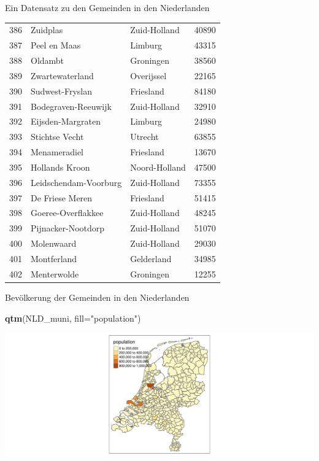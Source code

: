 \documentclass[ignorenonframetext,]{beamer}
\newenvironment{Shaded}{\begin{snugshade}}{\end{snugshade}}
\newcommand{\DataTypeTok}[1]{\textcolor[rgb]{0.13,0.29,0.53}{#1}}
\newcommand{\KeywordTok}[1]{\textcolor[rgb]{0.13,0.29,0.53}{\textbf{#1}}}
\newcommand{\NormalTok}[1]{#1}
\newcommand{\StringTok}[1]{\textcolor[rgb]{0.31,0.60,0.02}{#1}}
\begin{document}
\begin{frame}[fragile]{Ein Datensatz zu den Gemeinden in den
Niederlanden}
\begin{longtable}[]{@{}lllr@{}}
386 & Zuidplas & Zuid-Holland & 40890\tabularnewline
387 & Peel en Maas & Limburg & 43315\tabularnewline
388 & Oldambt & Groningen & 38560\tabularnewline
389 & Zwartewaterland & Overijssel & 22165\tabularnewline
390 & Sudwest-Fryslan & Friesland & 84180\tabularnewline
391 & Bodegraven-Reeuwijk & Zuid-Holland & 32910\tabularnewline
392 & Eijsden-Margraten & Limburg & 24980\tabularnewline
393 & Stichtse Vecht & Utrecht & 63855\tabularnewline
394 & Menameradiel & Friesland & 13670\tabularnewline
395 & Hollands Kroon & Noord-Holland & 47500\tabularnewline
396 & Leidschendam-Voorburg & Zuid-Holland & 73355\tabularnewline
397 & De Friese Meren & Friesland & 51415\tabularnewline
398 & Goeree-Overflakkee & Zuid-Holland & 48245\tabularnewline
399 & Pijnacker-Nootdorp & Zuid-Holland & 51070\tabularnewline
400 & Molenwaard & Zuid-Holland & 29030\tabularnewline
401 & Montferland & Gelderland & 34985\tabularnewline
402 & Menterwolde & Groningen & 12255\tabularnewline
\bottomrule
\end{longtable}

\end{frame}

\begin{frame}[fragile]{Bevölkerung der Gemeinden in den Niederlanden}
\protect\hypertarget{bevolkerung-der-gemeinden-in-den-niederlanden}{}

\begin{Shaded}
\begin{Highlighting}[]
\KeywordTok{qtm}\NormalTok{(NLD_muni, }\DataTypeTok{fill=}\StringTok{"population"}\NormalTok{) }
\end{Highlighting}
\end{Shaded}

\includegraphics{A4_tmap_files/figure-beamer/unnamed-chunk-35-1.pdf}

\end{frame}
\end{document}
